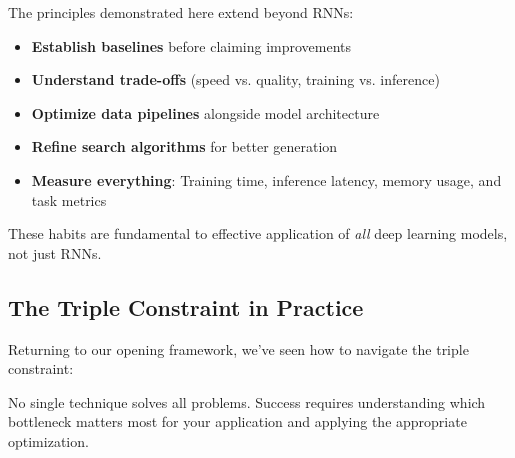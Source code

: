 \documentclass{article}
\begin{document}
\begin{tcolorbox}[colback=orange!5!white, colframe=orange!50!black, title=The Empirical Mindset]
The principles demonstrated here extend beyond RNNs:
\begin{itemize}
\item \textbf{Establish baselines} before claiming improvements
\item \textbf{Understand trade-offs} (speed vs. quality, training vs. inference)
\item \textbf{Optimize data pipelines} alongside model architecture
\item \textbf{Refine search algorithms} for better generation
\item \textbf{Measure everything}: Training time, inference latency, memory usage, and task metrics
\end{itemize}

These habits are fundamental to effective application of \textit{all} deep learning models, not just RNNs.
\end{tcolorbox}

\subsection{The Triple Constraint in Practice}

Returning to our opening framework, we've seen how to navigate the triple constraint:

\begin{center}
\end{center}

No single technique solves all problems. Success requires understanding which bottleneck matters most for your application and applying the appropriate optimization.
\end{document}
